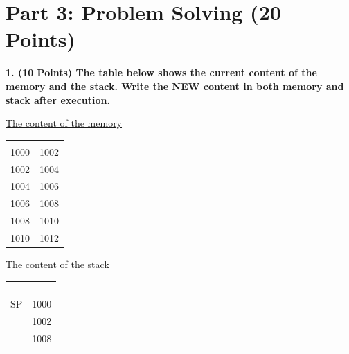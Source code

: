 \documentclass[a4paper,12pt]{article}
\begin{document}
\newpage

\section*{Part 3: Problem Solving (20 Points)}

\textbf{1. (10 Points) The table below shows the current content of the memory and the stack. Write the NEW content in both memory and stack after execution.}

\begin{center}
    \begin{minipage}[t]{0.45\textwidth}
        \centering
        \underline{The content of the memory} \\ \vspace{0.2cm}
        \begin{tabular}{r|w{c}{1.2cm}|}
             \\ 
            1000 & 1002 \\ 
            1002 & 1004 \\ 
            1004 & 1006 \\ 
            1006 & 1008 \\ 
            1008 & 1010 \\ 
            1010 & 1012 \\ 
        \end{tabular}
    \end{minipage}
    \hfill
    \begin{minipage}[t]{0.45\textwidth}
        \centering
        \underline{The content of the stack} \\ \vspace{0.2cm}
        \begin{tabular}{r|w{c}{1.2cm}|}
             \\ 
             & \\ 
             & \\ 
             & \\ 
            SP & 1000 \\ 
             & 1002 \\ 
             & 1008 \\ 
        \end{tabular}
    \end{minipage}
\end{center}
\end{document}
